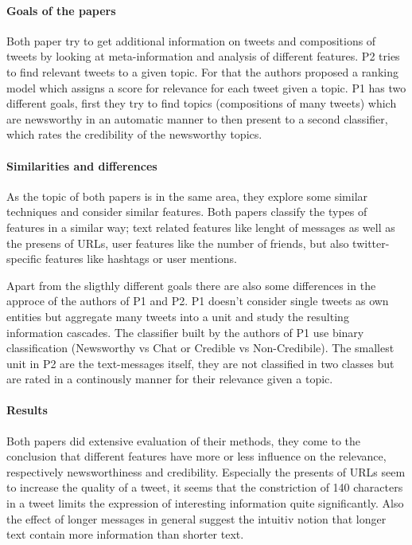 \documentclass{proseminar}
\begin{document}
\paragraph{Goals of the papers}
Both paper try to get additional information on tweets and compositions of tweets by looking at meta-information and analysis of different features.
P2 tries to find relevant tweets to a given topic. For that the authors proposed a ranking model which assigns a score for relevance for each tweet given a topic.
P1 has two different goals, first they try to find topics (compositions of many tweets) which are newsworthy in an automatic manner to then present to a second classifier, which rates the credibility of the newsworthy topics.

\paragraph{Similarities and differences}
As the topic of both papers is in the same area, they explore some similar techniques and consider similar features. Both papers classify the types of features in a similar way; text related features like lenght of messages as well as the presens of URLs, user features like the number of friends, but also twitter-specific features like hashtags or user mentions.

Apart from the sligthly different goals there are also some differences in the approce of the authors of P1 and P2. P1 doesn't consider single tweets as own entities but aggregate many tweets into a unit and study the resulting information cascades. The classifier built by the authors of P1 use binary classification (Newsworthy vs Chat or Credible vs Non-Credibile).
The smallest unit in P2 are the text-messages itself, they are not classified in two classes but are rated in a continously manner for their relevance given a topic.

\paragraph{Results}
Both papers did extensive evaluation of their methods, they come to the conclusion that different features have more or less influence on the relevance, respectively newsworthiness and credibility. Especially the presents of URLs seem to increase the quality of a tweet, it seems that the constriction of 140 characters in a tweet limits the expression of interesting information quite significantly. Also the effect of longer messages in general suggest the intuitiv notion that longer text contain more information than shorter text.
\end{document}
